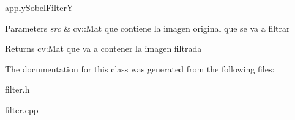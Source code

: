 apply\+Sobel\+Filter\+Y 


\begin{DoxyParams}{Parameters}
{\em src} & cv\+::\+Mat que contiene la imagen original que se va a filtrar \\
\hline
\end{DoxyParams}
\begin{DoxyReturn}{Returns}
cv\+:Mat que va a contener la imagen filtrada 
\end{DoxyReturn}


The documentation for this class was generated from the following files\+:\begin{DoxyCompactItemize}
\item 
filter.\+h\item 
filter.\+cpp\end{DoxyCompactItemize}
